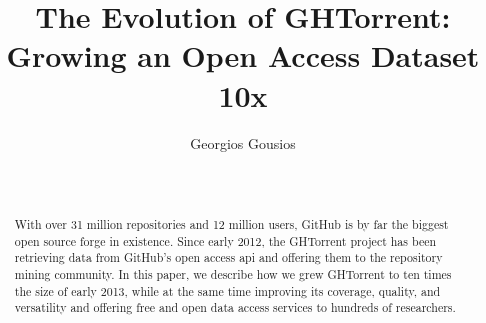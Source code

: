 \documentclass{sig-alternate}
\begin{document}






%

\title{The Evolution of GHTorrent: Growing an Open Access Dataset 10x}
%
\author{
%
\alignauthor Georgios Gousios\\
       \\
       \\
}

\maketitle
\begin{abstract}

With over 31 million repositories and 12 million users, GitHub is by far the
biggest open source forge in existence. Since early 2012, the GHTorrent project
has been retrieving data from GitHub's open access {\sc api} and offering them
to the repository mining community. In this paper, we describe how we grew
GHTorrent to ten times the size of early 2013, while at the same time improving
its coverage, quality, and versatility and offering free and open data access
services to hundreds of researchers.

\end{abstract}
\end{document}
